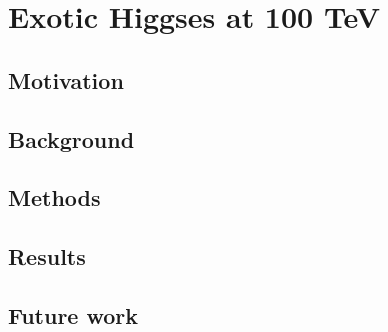 \chapter{Exotic Higgses at 100 TeV}\label{ch:ExoticHiggs}
\section{Motivation}
\section{Background}
\section{Methods}
\section{Results}
\section{Future work}
